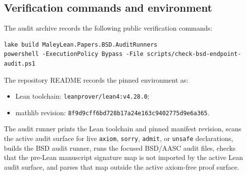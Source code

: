 \documentclass[11pt]{article}
\begin{document}
\subsection{Verification commands and environment}
The audit archive records the following public verification commands:
\begin{verbatim}
lake build MaleyLean.Papers.BSD.AuditRunners
powershell -ExecutionPolicy Bypass -File scripts/check-bsd-endpoint-audit.ps1
\end{verbatim}
The repository README records the pinned environment as:
\begin{itemize}
\item Lean toolchain: \texttt{leanprover/lean4:v4.28.0};
\item mathlib revision: \texttt{8f9d9cff6bd728b17a24e163c9402775d9e6a365}.
\end{itemize}
The audit runner prints the Lean toolchain and pinned manifest revision, scans the active audit surface for live \texttt{axiom}, \texttt{sorry}, \texttt{admit}, or \texttt{unsafe} declarations, builds the BSD audit runner, runs the focused BSD/AASC audit files, checks that the pre-Lean manuscript signature map is not imported by the active Lean audit surface, and parses that map outside the active axiom-free proof surface.
\end{document}
